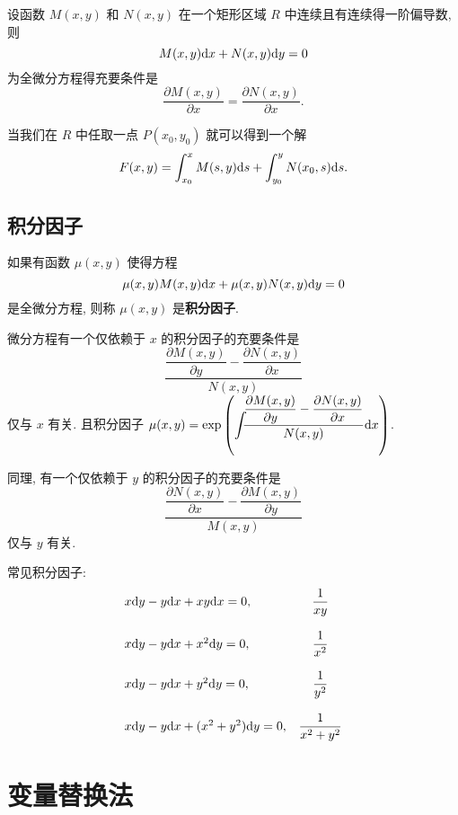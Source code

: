 \begin{theorem}
	设函数 $M(x,y)$ 和 $N(x,y)$ 在一个矩形区域 $R$ 中连续且有连续得一阶偏导数, 则 $$M(x,y)\text {d} x+N(x,y)\text {d} y=0$$ 为全微分方程得充要条件是 $$\frac{\partial M(x,y)}{\partial x}=\frac{\partial N(x,y)}{\partial x}.$$
\end{theorem}

当我们在 $R$ 中任取一点 $P(x_0,y_0)$ 就可以得到一个解 $$F(x,y)=\int_{x_0}^x M(s,y)\text {d} s + \int_{y_0}^y N(x_0,s)\text {d} s.$$

\subsection{积分因子}

\begin{definition}
	如果有函数 $\mu(x,y)$ 使得方程 $$\mu(x,y)M(x,y)\text {d} x+\mu(x,y)N(x,y)\text {d} y=0$$ 是全微分方程, 则称 $\mu(x,y)$ 是\textbf{积分因子}.
\end{definition}

\begin{theorem}
	微分方程有一个仅依赖于 $x$ 的积分因子的充要条件是
	$$\dfrac{\dfrac{\partial M(x,y)}{\partial y}-\dfrac{\partial N(x,y)}{\partial x}}{N(x,y)}$$ 仅与 $x$ 有关.
	且积分因子 $\mu(x,y)=\exp\left(\displaystyle {\int}_{\hspace{-0.4em} } \dfrac{\dfrac{\partial M(x,y)}{\partial y}-\dfrac{\partial N(x,y)}{\partial x}}{N(x,y)} \text {d} x\right)$.
	
	同理, 有一个仅依赖于 $y$ 的积分因子的充要条件是
	$$\dfrac{\dfrac{\partial N(x,y)}{\partial x}-\dfrac{\partial M(x,y)}{\partial y}}{M(x,y)}$$ 仅与 $y$ 有关.
\end{theorem}

常见积分因子:
$$
\begin{array}{lc}
	x\text {d} y - y\text {d} x+xy\text {d} x=0, & \dfrac{1}{xy} \\
	&\\
	x\text {d} y - y\text {d} x+x^2\text {d} y=0, & \dfrac{1}{x^2} \\
	&\\
	x\text {d} y - y\text {d} x+y^2\text {d} y=0, & \dfrac{1}{y^2} \\
	&\\
	x\text {d} y - y\text {d} x+(x^2+y^2)\text {d} y=0, & \dfrac{1}{x^2+y^2} 
\end{array}
$$

\section{变量替换法}

